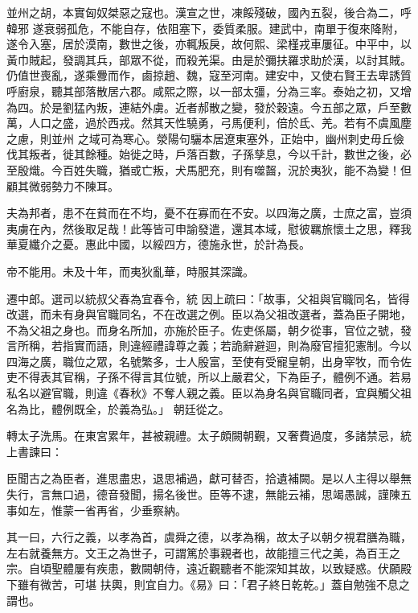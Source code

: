 \begin{pinyinscope}
 並州之胡，本實匈奴桀惡之寇也。漢宣之世，凍餒殘破，國內五裂，後合為二，呼韓邪
 遂衰弱孤危，不能自存，依阻塞下，委質柔服。建武中，南單于復來降附，遂令入塞，居於漠南，數世之後，亦輒叛戾，故何熙、梁槿戎車屢征。中平中，以黃巾賊起，發調其兵，部眾不從，而殺羌渠。由是於彌扶羅求助於漢，以討其賊。仍值世喪亂，遂乘釁而作，鹵掠趙、魏，寇至河南。建安中，又使右賢王去卑誘質呼廚泉，聽其部落散居六郡。咸熙之際，以一部太彊，分為三率。泰始之初，又增為四。於是劉猛內叛，連結外虜。近者郝散之變，發於穀遠。今五部之眾，戶至數萬，人口之盛，過於西戎。然其天性驍勇，弓馬便利，倍於氐、羌。若有不虞風塵之慮，則並州
 之域可為寒心。滎陽句驪本居遼東塞外，正始中，幽州刺史毋丘儉伐其叛者，徙其餘種。始徙之時，戶落百數，子孫孳息，今以千計，數世之後，必至殷熾。今百姓失職，猶或亡叛，犬馬肥充，則有噬齧，況於夷狄，能不為變！但顧其微弱勢力不陳耳。



 夫為邦者，患不在貧而在不均，憂不在寡而在不安。以四海之廣，士庶之富，豈須夷虜在內，然後取足哉！此等皆可申諭發遣，還其本域，慰彼羈旅懷土之思，釋我華夏纖介之憂。惠此中國，以綏四方，德施永世，於計為長。



 帝不能用。未及十年，而夷狄亂華，時服其深識。



 遷中郎。選司以統叔父春為宜春令，統
 因上疏曰：「故事，父祖與官職同名，皆得改選，而未有身與官職同名，不在改選之例。臣以為父祖改選者，蓋為臣子開地，不為父祖之身也。而身名所加，亦施於臣子。佐吏係屬，朝夕從事，官位之號，發言所稱，若指實而語，則違經禮諱尊之義；若詭辭避迴，則為廢官擅犯憲制。今以四海之廣，職位之眾，名號繁多，士人殷富，至使有受寵皇朝，出身宰牧，而令佐吏不得表其官稱，子孫不得言其位號，所以上嚴君父，下為臣子，體例不通。若易私名以避官職，則違《春秋》不奪人親之義。臣以為身名與官職同者，宜與觸父祖名為比，體例既全，於義為弘。」
 朝廷從之。



 轉太子洗馬。在東宮累年，甚被親禮。太子頗闕朝覲，又奢費過度，多諸禁忌，統上書諫曰：



 臣聞古之為臣者，進思盡忠，退思補過，獻可替否，拾遺補闕。是以人主得以舉無失行，言無口過，德音發聞，揚名後世。臣等不逮，無能云補，思竭愚誠，謹陳五事如左，惟蒙一省再省，少垂察納。



 其一曰，六行之義，以孝為首，虞舜之德，以孝為稱，故太子以朝夕視君膳為職，左右就養無方。文王之為世子，可謂篤於事親者也，故能擅三代之美，為百王之宗。自頃聖體屢有疾患，數闕朝侍，遠近觀聽者不能深知其故，以致疑惑。伏願殿下雖有微苦，可堪
 扶輿，則宜自力。《易》曰：「君子終日乾乾。」蓋自勉強不息之謂也。




\end{pinyinscope}
